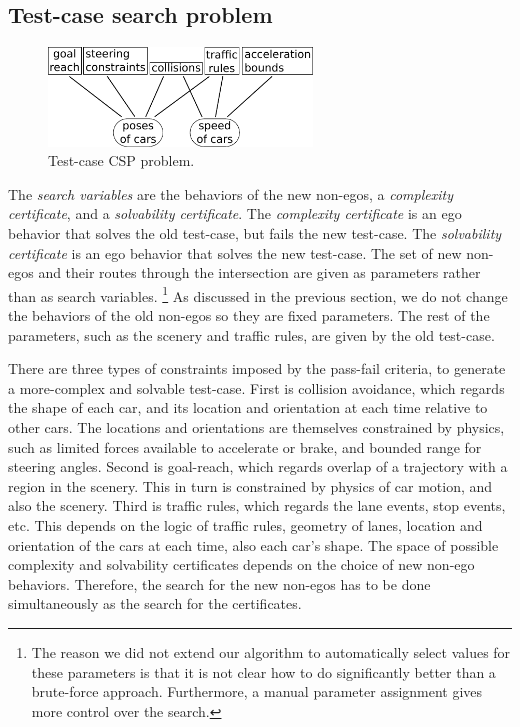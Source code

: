\subsection{Test-case search problem}
\label{sec:problem}

\begin{figure}
\centering
\includegraphics[width=70mm]{figures/chapter4/problem.pdf}%
\caption{Test-case CSP problem.}
\label{fig:problem}%
\end{figure}

The \emph{search variables} are the behaviors of the new non-egos, a \emph{complexity certificate}, and a \emph{solvability certificate}.
%
The \emph{complexity certificate} is an ego behavior that solves the old test-case, but fails the new test-case.
%
The \emph{solvability certificate} is an ego behavior that solves the new test-case.
%
The set of new non-egos and their routes through the intersection are given as parameters rather than as search variables.%
\footnote{The reason we did not extend our algorithm to automatically select values for these parameters is that it is not clear how to do significantly better than a brute-force approach.
%
Furthermore, a manual parameter assignment gives more control over the search.}
%
As discussed in the previous section, we do not change the behaviors of the old non-egos so they are fixed parameters.
%
The rest of the parameters, such as the scenery and traffic rules, are given by the old test-case.


There are three types of constraints imposed by the pass-fail criteria, to generate a more-complex and solvable test-case.
%
First is collision avoidance, which regards the shape of each car, and its location and orientation at each time relative to other cars.
%
The locations and orientations are themselves constrained by physics, such as limited forces available to accelerate or brake, and bounded range for steering angles.
%
Second is goal-reach, which regards overlap of a trajectory with a region in the scenery.
%
This in turn is constrained by physics of car motion, and also the scenery.
%
Third is traffic rules, which regards the lane events, stop events, etc.
%
This depends on the logic of traffic rules, geometry of lanes, location and orientation of the cars at each time, also each car's shape.
%
The space of possible complexity and solvability certificates depends on the choice of new non-ego behaviors.
%
Therefore, the search for the new non-egos has to be done simultaneously as the search for the certificates.


